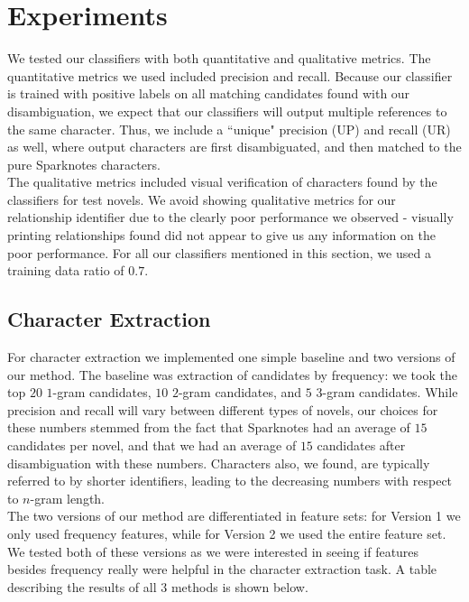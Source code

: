 \documentclass[12pt]{article}
\begin{document}
\section{Experiments}

    We tested our classifiers with both quantitative and qualitative metrics. The quantitative
    metrics we used included precision and recall. Because our classifier is trained with positive 
    labels on all matching candidates found with our disambiguation, we expect that our classifiers 
    will output multiple references to the same character. Thus, we include a ``unique" precision (UP) 
    and recall (UR) as well, where output characters are first disambiguated, and then matched to
    the pure Sparknotes characters. \\
    
    The qualitative metrics included visual verification of characters found 
    by the classifiers for test novels. We avoid showing qualitative metrics for our 
    relationship identifier due to the clearly poor performance we observed - visually
    printing relationships found did not appear to give us any information on the poor performance. 
    For all our classifiers mentioned in this section, we used a training data ratio of $0.7$. 

    \subsection{Character Extraction}
        
        For character extraction we implemented one simple baseline and two versions of our method.
        The baseline was extraction of candidates by frequency: we took the top $20$ $1$-gram candidates,
        $10$ $2$-gram candidates, and $5$ $3$-gram candidates. While precision and recall will vary
        between different types of novels, our choices for these numbers stemmed
        from the fact that Sparknotes had an average of $15$ candidates per novel, and that we had an average of
        $15$ candidates after disambiguation with these numbers. Characters also, we found, are typically
        referred to by shorter identifiers, leading to the decreasing numbers with respect to $n$-gram length. \\

        The two versions of our method are differentiated in feature sets: for Version 1 we only used
        frequency features, while for Version 2 we used the entire feature set. We tested both of these versions
        as we were interested in seeing if features besides frequency really were helpful in the character
        extraction task. A table describing the results of all $3$ methods is shown below. 
\end{document}
